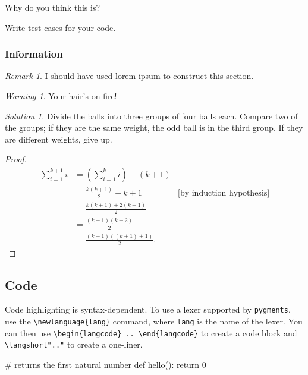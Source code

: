 \documentclass{article}
\theoremstyle{plain}
\theoremstyle{definition}
\theoremstyle{remark}
\newtheorem*{remark}{Remark}
\newtheorem*{warning}{Warning}
\newtheorem*{solution}{Solution}
\renewcommand{\newlanguage}[1]{
\newminted{#1}{linenos,numbersep=5pt,bgcolor=codebg,tabsize=2}
\newmint[#1short]{#1}{bgcolor=codebg}}
\begin{document}
\begin{question}
Why do you think this is?
\end{question}

\begin{task}
Write test cases for your code.
\end{task}

\subsubsection{Information}

\begin{remark}
I should have used lorem ipsum to construct this section.
\end{remark}

\begin{warning}
Your hair's on fire!
\end{warning}

\begin{solution}
Divide the balls into three groups of four balls each. Compare two of the groups; if they are the same weight, the odd ball is in the third group. If they are different weights, give up.
\end{solution}

\begin{proof}
\begin{align*}
\sum_{i=1}^{k+1}i & = \left(\sum_{i=1}^{k}i\right) +(k+1)\\ 
& = \frac{k(k+1)}{2}+k+1 & \text{[by induction hypothesis]}\\
& = \frac{k(k+1)+2(k+1)}{2}\\
& = \frac{(k+1)(k+2)}{2}\\
& = \frac{(k+1)((k+1)+1)}{2}.
\end{align*}
\qedhere
\end{proof}

\subsection{Code}

Code highlighting is syntax-dependent. To use a lexer supported by \texttt{pygments}, use the \verb|\newlanguage{lang}| command, where \texttt{lang} is the name of the lexer. You can then use \verb|\begin{langcode} .. \end{langcode}| to create a code block and \verb|\langshort".."| to create a one-liner.

\begin{pythoncode}
# returns the first natural number
def hello():
  return 0
\end{pythoncode}
\end{document}
